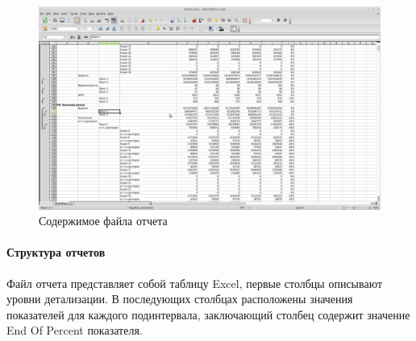 \begin{figure}[!ht]
\begin{center}
\hspace*{-1cm} \includegraphics[scale=0.35, trim=0mm 100mm 150mm 50mm, clip]{../resources/report1.png}
\caption{Содержимое файла отчета}
\end{center}
\end{figure}

\paragraph{Структура отчетов}
Файл отчета представляет собой таблицу Excel, первые
столбцы описывают уровни детализации. В последующих столбцах
расположены значения показателей для каждого подинтервала, заключающий столбец
содержит значение End Of Percent показателя.


